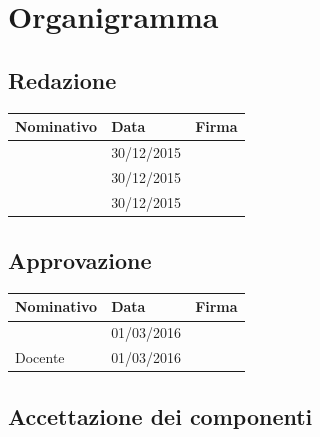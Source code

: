 \documentclass[12pt,a4paper]{article}
\begin{document}
\appendix
\section{Organigramma}

\subsection{Redazione}

\begin{table}[H]
	\begin{center}
		\begin{tabular}{l l l}
			\toprule
            \textbf{Nominativo}	& \textbf{Data} & \textbf{Firma} \\ \midrule
			\midrule
			\TP & 30/12/2015 & \\ \midrule
			\NDC & 30/12/2015 & \\ \midrule
			\WS & 30/12/2015 & \\
			\bottomrule
		\end{tabular}
	\end{center}
\end{table}

\subsection{Approvazione}

\begin{table}[H]
	\begin{center}
		\begin{tabular}{l l l}
			\toprule
            \textbf{Nominativo}	& \textbf{Data} & \textbf{Firma} \\ \midrule
			\midrule
			\RE & 01/03/2016 & \\ \midrule
			Docente & 01/03/2016 & \\
			\bottomrule
		\end{tabular}
	\end{center}
\end{table}

\subsection{Accettazione dei componenti}
\end{document}
